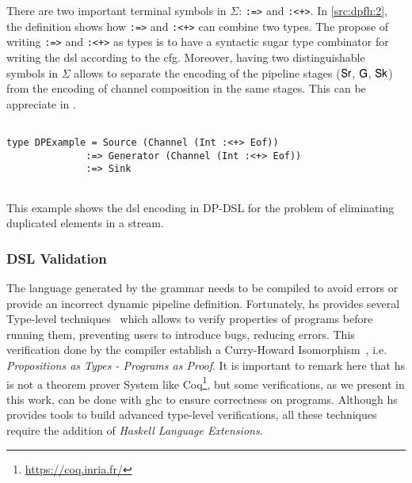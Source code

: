 There are two important terminal symbols in $\Sigma$: \texttt{:=>} and \texttt{:<+>}.
In \autoref{src:dpfh:2}, the definition shows how \texttt{:=>} and \texttt{:<+>} can combine two types.  The propose of writing \texttt{:=>} and \texttt{:<+>} as types is to have a syntactic sugar type combinator for writing the \acrshort{dsl} according to the \acrshort{cfg}. Moreover, having two distinguishable symbols in $\Sigma$ allows to separate the encoding of the pipeline stages ($\mathsf{Sr}$, $\mathsf{G}$, $\mathsf{Sk}$)
from the encoding of channel composition in the same stages. This can be appreciate in .

\iffalse
Now, one can start defining pipelines at type-level. For example, if we want to generate a dynamic pipeline for  eliminating duplicated elements in a stream,  we only need one channel connecting the stages that carries out the type of the element, in this case, \texttt{Int} (see \autoref{src:dpfh:3}).
\fi
\begin{listing}[H]
  \begin{verbatim}

type DPExample = Source (Channel (Int :<+> Eof)) 
              :=> Generator (Channel (Int :<+> Eof)) 
              :=> Sink
   
  \end{verbatim}
  \caption[{[\texttt{Repeated.hs} Example of \acrshort{dp} encoded in $G_{dsl}$}]{This example shows the \acrshort{dsl} encoding in DP-DSL for the problem of eliminating duplicated elements in a stream.}
  \label{src:dpfh:3}
\end{listing}

\subsubsection{DSL Validation}\label{sub:sec:dsl-val}
The language generated by the grammar needs to be compiled  to avoid errors or provide an incorrect dynamic pipeline definition.
Fortunately, \acrshort{hs} provides several Type-level techniques~\cite{type-haskell} which allows to verify properties of programs before running them, 
preventing users to introduce bugs, reducing errors. This verification done by the compiler establish a Curry-Howard Isomorphism~\cite{curryhoward}, i.e. 
\emph{Propositions as Types - Programs as Proof}. It is important to remark here that \acrshort{hs} is not a theorem prover System like Coq\footnote{\url{https://coq.inria.fr/}}, but some verifications, as we present in this work, can be done with \acrshort{ghc} to ensure correctness on programs.
Although \acrshort{hs} provides tools to build advanced type-level verifications, all these techniques require the addition of \emph{Haskell Language Extensions}.


